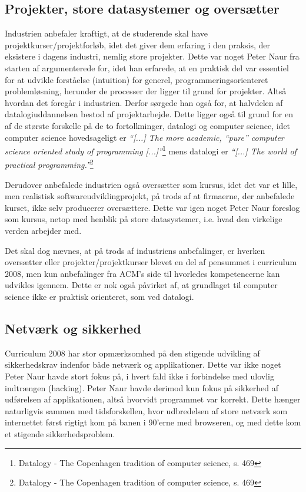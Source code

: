 \documentclass[10pt,a4paper]{article}
\newcommand{\citat}[2]{\vspace{0.1cm}\newline\textit{``#1''}\hspace{0.1cm}\footnote{#2}\vspace{0.1cm}\newline}
\begin{document}
\subsection{Projekter, store datasystemer og oversætter}
Industrien anbefaler kraftigt, at de studerende skal have
projektkurser/projektforløb, idet det giver dem erfaring i den praksis, der
eksistere i dagens industri, nemlig store projekter. Dette var noget Peter Naur
fra starten af argumenterede for, idet han erfarede, at en praktisk del var
essentiel for at udvikle forståelse (intuition) for generel,
programmeringsorienteret problemløsning, herunder de processer der ligger til
grund for projekter. Altså hvordan det foregår i industrien. Derfor sørgede han
også for, at halvdelen af datalogiuddannelsen bestod af projektarbejde. Dette
ligger også til grund for en af de største forskelle på de to fortolkninger,
datalogi og computer science, idet computer science hovedsageligt er
\citat{[...] The more academic, ``pure'' computer science oriented study of
    programming [...]}{Datalogy - The Copenhagen tradition of computer science,
    s. 469} mens datalogi er \citat{[...] The world of practical
    programming.}{Datalogy - The Copenhagen tradition of computer science, s.
    469}

Derudover anbefalede industrien også oversætter som kursus, idet det var et
lille, men realistisk softwareudviklingprojekt, på trods af at firmaerne, der
anbefalede kurset, ikke selv producerer oversættere. Dette var igen noget Peter
Naur foreslog som kursus, netop med henblik på store datasystemer, i.e. hvad den
virkelige verden arbejder med.

Det skal dog nævnes, at på trods af industriens anbefalinger, er hverken
oversætter eller projekter/projektkurser blevet en del af pensummet i curriculum
2008, men kun anbefalinger fra ACM's side til hvorledes kompetencerne kan
udvikles igennem. Dette er nok også påvirket af, at grundlaget til computer
science ikke er praktisk orienteret, som ved datalogi.

\subsection{Netværk og sikkerhed}
Curriculum 2008 har stor opmærksomhed på den stigende udvikling af
sikkerhedskrav indenfor både netværk og applikationer. Dette var ikke noget
Peter Naur havde stort fokus på, i hvert fald ikke i forbindelse med ulovlig
indtrængen (hacking). Peter Naur havde derimod kun fokus på sikkerhed af
udførelsen af applikationen, altså hvorvidt programmet var korrekt. Dette hænger
naturligvis sammen med tidsforskellen, hvor udbredelsen af store netværk som
internettet først rigtigt kom på banen i 90'erne med browseren, og med dette kom
et stigende sikkerhedsproblem.
\end{document}
